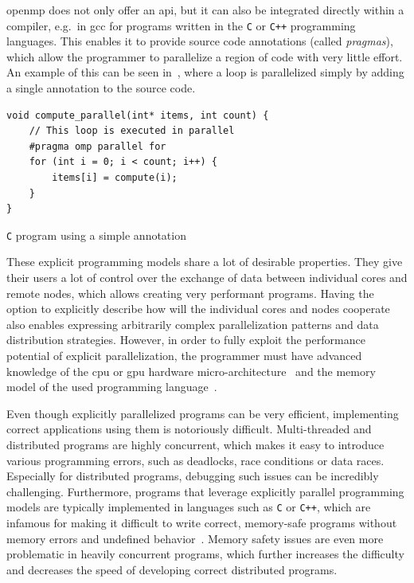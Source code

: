 \begin{description}[wide=0pt]
		\gls{openmp} does not only offer an \gls{api}, but it can also be
		integrated directly within a compiler, e.g.\ in \gls{gcc} for programs written in the
		\texttt{C} or \texttt{C++} programming languages. This enables it to provide
		source code annotations (called \emph{pragmas}), which allow the programmer to parallelize
		a region of code with very little effort. An example of this can be seen in~,
		where a loop is parallelized simply by adding a single annotation to the source code.

		\begin{listing}
			\begin{verbatim}
void compute_parallel(int* items, int count) {
	// This loop is executed in parallel
	#pragma omp parallel for
	for (int i = 0; i < count; i++) {
		items[i] = compute(i);
	}
}
        	\end{verbatim}
			\caption{\texttt{C} program using a simple  annotation}
			\label{lst:openmp-annotation}
		\end{listing}
\end{description}

These explicit programming models share a lot of desirable properties. They give their users a lot
of control over the exchange of data between individual cores and remote nodes, which allows
creating very performant programs. Having the option to explicitly describe how will the individual
cores and nodes cooperate also enables expressing arbitrarily complex parallelization patterns and
data distribution strategies. However, in order to fully exploit the performance potential of
explicit parallelization, the programmer must have advanced knowledge of the \gls{cpu}
or \gls{gpu} hardware micro-architecture~\cite{intel_developer_manual} and the memory model
of the used programming language~\cite{cpp11_standard}.

Even though explicitly parallelized programs can be very efficient, implementing correct
applications using them is notoriously difficult. Multi-threaded and distributed programs are
highly concurrent, which makes it easy to introduce various programming errors, such as deadlocks,
race conditions or data races. Especially for distributed programs, debugging such issues can be
incredibly challenging. Furthermore, programs that leverage explicitly parallel programming models
are typically implemented in languages such as \texttt{C} or \texttt{C++},
which are infamous for making it difficult to write correct, memory-safe programs without memory
errors and undefined behavior~\cite{memory_safety_report}. Memory safety issues are even more
problematic in heavily concurrent programs, which further increases the difficulty and decreases
the speed of developing correct distributed programs.

